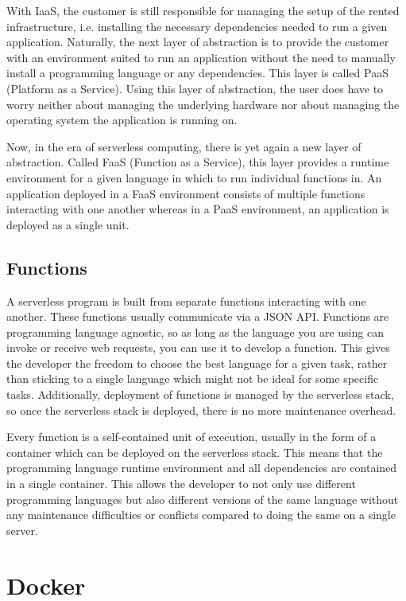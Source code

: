 With IaaS, the customer is still responsible for managing the setup of the rented infrastructure,
i.e. installing the necessary dependencies needed to run a given application. Naturally, the next
layer of abstraction is to provide the customer with an environment suited to run an application
without the need to manually install a programming language or any dependencies. This layer is
called PaaS (Platform as a Service). Using this layer of abstraction, the user does have to worry
neither about managing the underlying hardware nor about managing the operating system the
application is running on.

Now, in the era of serverless computing, there is yet again a new layer of abstraction. Called FaaS
(Function as a Service), this layer provides a runtime environment for a given language in which to
run individual functions in. An application deployed in a FaaS environment consists of multiple
functions interacting with one another whereas in a PaaS environment, an application is deployed as
a single unit.

\subsection{Functions}

A serverless program is built from separate functions interacting with one another. These functions
usually communicate via a JSON API. Functions are programming language agnostic, so as long as the
language you are using can invoke or receive web requests, you can use it to develop a function.
This gives the developer the freedom to choose the best language for a given task, rather than
sticking to a single language which might not be ideal for some specific tasks. Additionally,
deployment of functions is managed by the serverless stack, so once the serverless stack is
deployed, there is no more maintenance overhead.

Every function is a self-contained unit of execution, usually in the form of a container which can
be deployed on the serverless stack. This means that the programming language runtime environment
and all dependencies are contained in a single container. This allows the developer to not only use
different programming languages but also different versions of the same language without any
maintenance difficulties or conflicts compared to doing the same on a single server.

\section{Docker}

